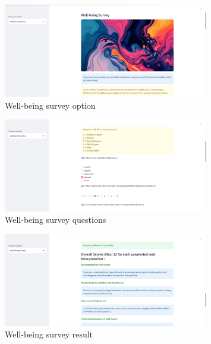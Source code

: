 \begin{figure}[h!]  
    \centering
    \includegraphics[width=0.8\textwidth]{App Images/28 Interface.png}  
    \caption{Well-being survey option}
    \label{10i23445}  %
\end{figure} 

\pagebreak

\begin{figure}[h!]  
    \centering
    \includegraphics[width=0.8\textwidth]{App Images/29 Interface.png}  
    \caption{Well-being survey questions}
    \label{10i23445}  %
\end{figure} 

\begin{figure}[h!]  
    \centering
    \includegraphics[width=0.8\textwidth]{App Images/30 Interface.png}  
    \caption{Well-being survey result}
    \label{10i23445}  %
\end{figure} 

